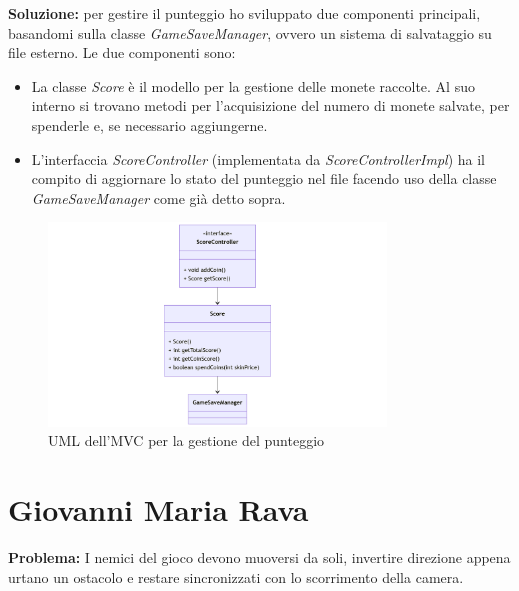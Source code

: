 \documentclass[a4paper,12pt]{report}
\begin{document}
\textbf{Soluzione:} per gestire il punteggio ho sviluppato due componenti principali, basandomi sulla classe \emph{GameSaveManager}, ovvero un sistema di
salvataggio su file esterno. Le due componenti sono:
\begin{itemize}
    \item La classe \emph{Score} è il modello per la gestione delle monete raccolte. Al suo interno si trovano metodi per l'acquisizione del numero di monete
    salvate, per spenderle e, se necessario aggiungerne.
    \item L'interfaccia \emph{ScoreController} (implementata da \emph{ScoreControllerImpl}) ha il compito di aggiornare lo stato del punteggio nel file facendo 
    uso della classe \emph{GameSaveManager} come già detto sopra.
\end{itemize}
\begin{figure}
    \centering
    \includegraphics[width=0.8\textwidth]{resources/UMLscore.png}
    \caption{UML dell'MVC per la gestione del punteggio}
\end{figure}

\section{Giovanni Maria Rava}
\textbf{Problema:} I nemici del gioco devono muoversi da soli, invertire direzione appena urtano un ostacolo e restare sincronizzati con 
lo scorrimento della camera. 
\end{document}
